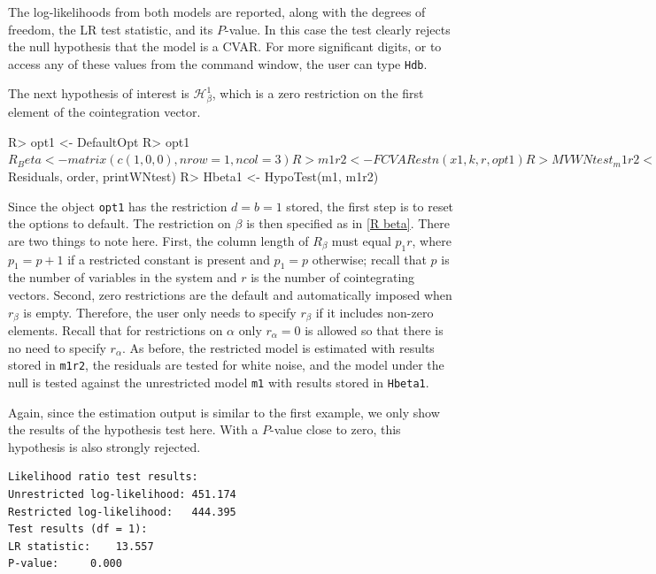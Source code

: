 \documentclass[article]{jss}
\begin{document}
The log-likelihoods from both models are reported, along with the degrees of freedom, the LR test statistic, and its $P$-value. In this case the test clearly rejects the null hypothesis that the model is a CVAR. For more significant digits, or to access any of these values from the command window, the user can type \verb|Hdb|.

The next hypothesis of interest is $\mathscr{H}_{\beta}^1$, which is a zero restriction on the first element of the cointegration vector.

\begin{Code}
R> opt1 <- DefaultOpt
R> opt1$R_Beta <- matrix(c(1, 0, 0), nrow = 1, ncol = 3)
R> m1r2 <- FCVARestn(x1, k, r, opt1)
R> MVWNtest_m1r2 <- MVWNtest(m1r2$Residuals, order, printWNtest)
R> Hbeta1 <- HypoTest(m1, m1r2)
\end{Code}

Since the object \verb|opt1| has the restriction $d=b=1$ stored, the first step is to reset the options to default. The restriction on $\beta$ is then specified as in \eqref{R beta}. There are two things to note here. First, the column length of $R_{\beta}$ must equal $p_1 r$, where $p_1=p+1$ if a restricted constant is present and $p_1=p$ otherwise; recall that $p$ is the number of variables in the system and $r$ is the number of cointegrating vectors. Second, zero restrictions are the default and automatically imposed when $r_{\beta}$ is empty. Therefore, the user only needs to specify $r_{\beta}$ if it includes non-zero elements. Recall that for restrictions on $\alpha$ only $r_\alpha = 0$ is allowed so that there is no need to specify $r_\alpha$. As before, the restricted model is estimated with results stored in \verb|m1r2|, the residuals are tested for white noise, and the model under the null is tested against the unrestricted model \verb|m1| with results stored in \verb|Hbeta1|.

Again, since the estimation output is similar to the first example, we only show the results of the hypothesis test here. With a $P$-value close to zero, this hypothesis is also strongly rejected.

\begin{verbatim}
Likelihood ratio test results:
Unrestricted log-likelihood: 451.174
Restricted log-likelihood:   444.395
Test results (df = 1):
LR statistic: 	 13.557
P-value: 	 0.000
\end{verbatim}
\end{document}
